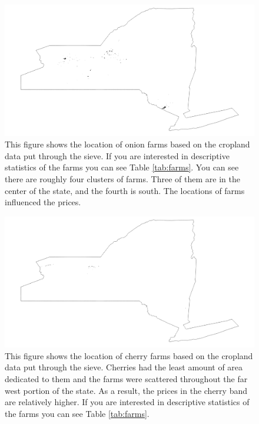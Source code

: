 \documentclass{report}
\begin{document}

\begin{figure}
\centering
\begin{framed}
\includegraphics[scale=.50]{farms_49}
\caption{This figure shows the location of onion farms based on the cropland data put through the sieve. If you are interested in descriptive statistics of the farms you can see Table \ref{tab:farms}. You can see there are roughly four clusters of farms. Three of them are in the center of the state, and the fourth is south. The locations of farms influenced the prices.}
\label{fig:farms_49}
\end{framed}
\end{figure}

\begin{figure}
\centering
\begin{framed}
\includegraphics[scale=.50]{farms_66}
\caption{This figure shows the location of cherry farms based on the cropland data put through the sieve. Cherries had the least amount of area dedicated to them and the farms were scattered throughout the far west portion of the state. As a result, the prices in the cherry band are relatively higher. If you are interested in descriptive statistics of the farms you can see Table \ref{tab:farms}.}
\label{fig:farms_66}
\end{framed}
\end{figure}
\end{document}
